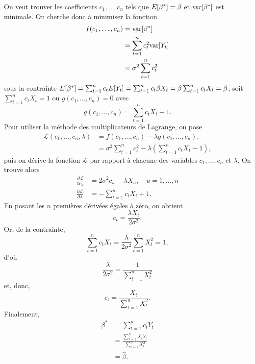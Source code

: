 \begin{solution}{2.7}
    On veut trouver les coefficients $c_1, \dots, c_n$ tels que
    $E [ \beta^* ] = \beta$ et $\mathrm{var} [ \beta^* ]$ est minimale. On
    cherche donc à minimiser la fonction
    \begin{align*}
      f(c_1, \dots, c_n)
      &= \mathrm{var} [ \beta^* ] \\
      &= \sum_{t=1}^n c_t^2 \mathrm{var} [ Y_t ] \\
      &= \sigma^2 \sum_{t=1}^n c_t^2
    \end{align*}
    sous la contrainte $E [ \beta^* ] = \sum_{t=1}^nc_tE [ Y_t ] =
    \sum_{t=1}^nc_t\beta X_t = \beta\sum_{t=1}^nc_tX_t = \beta$, soit
    $\sum_{t=1}^n c_t X_t = 1$ ou $g(c_1, \dots, c_n) = 0$ avec
    \begin{displaymath}
      g(c_1, \dots, c_n) = \sum_{t=1}^n c_t X_t - 1.
    \end{displaymath}
    Pour utiliser la méthode des multiplicateurs de Lagrange, on pose
    \begin{align*}
      \mathcal{L}(c_1, \dots, c_n,\lambda)
      &= f(c_1, \dots, c_n) - \lambda g(c_1, \dots, c_n), \\
      &= \sigma^2 \sum_{t=1}^n c_t^2 - \lambda
      \left(
        \sum_{t=1}^n c_t X_t - 1
      \right),
    \end{align*}
    puis on dérive la fonction $\mathcal{L}$ par rapport à chacune des
    variables $c_1, \dots, c_n$ et $\lambda$. On trouve alors
    \begin{align*}
      \frac{\partial \mathcal{L}}{\partial c_u}
      & = 2 \sigma^2 c_u - \lambda X_u, \quad u = 1, \dots, n \\
      \frac{\partial \mathcal{L}}{\partial \lambda}
      & = - \sum_{t=1}^n c_t X_t + 1.
    \end{align*}
    En posant les $n$ premières dérivées égales à zéro, on obtient
    \begin{displaymath}
      c_t = \frac{\lambda X_t}{2 \sigma^2}.
    \end{displaymath}
    Or, de la contrainte,
    \begin{displaymath}
      \sum_{t=1}^n c_t X_t =
      \frac{\lambda}{2\sigma^2} \sum_{t=1}^n X_t^2 = 1,
    \end{displaymath}
    d'où
    \begin{displaymath}
      \frac{\lambda}{2 \sigma^2} = \frac{1}{\sum_{t=1}^n X_t^2}
    \end{displaymath}
    et, donc,
    \begin{displaymath}
      c_t = \frac{X_t}{\sum_{t=1}^n X_t^2}.
    \end{displaymath}
    Finalement,
    \begin{align*}
      \beta^*
      & = \sum_{t=1}^n c_t Y_t \\
      & = \frac{\sum_{t=1}^n X_t Y_t}{\sum_{t=1}^n X_t^2} \\
      & = \hat{\beta}.
    \end{align*}
  
\end{solution}
